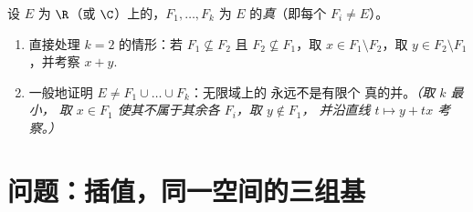 \begin{exercise}[$\star\star\star$]\label{exo:b1:vspaces:12}
设 $E$ 为 $\R$（或 $\C$）上的，$F_1, \dots,
F_k$ 为 $E$ 的\emph{真}（即每个 $F_i \neq E$）。
\begin{enumerate}
  \item 直接处理 $k = 2$ 的情形：若 $F_1 \not\subseteq
        F_2$ 且 $F_2 \not\subseteq F_1$，取 $x \in F_1
        \setminus F_2$，取 $y \in F_2 \setminus F_1$，并考察 $x
        + y$.
  \item 一般地证明 $E \neq F_1 \cup \dots \cup F_k$：无限域上的
        永远不是有限个
        真的并。\emph{（取 $k$ 最小，
        取 $x \in F_1$ 使其不属于其余各 $F_i$，取 $y \notin F_1$，
        并沿直线 $t \mapsto y + tx$ 考察。）}
\end{enumerate}
\end{exercise}

\section{问题：插值，同一空间的三组基}

